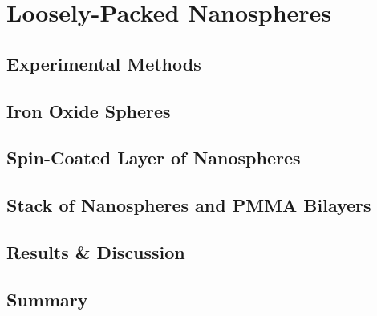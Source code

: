 \documentclass[\main/dresen_thesis.tex]{subfiles}
\renewcommand{\thisPath}{\main/chapters/looselyPackedNS}
\begin{document}
  \chapter{Loosely-Packed Nanospheres}\label{ch:looselyPackedNS}
    
      \FloatBarrier
      \clearpage

    \section{Experimental Methods}
      
        \FloatBarrier
        \clearpage

    \section{Iron Oxide Spheres}\label{sec:looselyPackedNP:sphericalIronOxideNP}
      
        \FloatBarrier
        \clearpage

    \section{Spin-Coated Layer of Nanospheres}
      
      \FloatBarrier
        \clearpage

    \section{Stack of Nanospheres and PMMA Bilayers}
      
      \FloatBarrier
        \clearpage

    \section{Results \& Discussion}
      \FloatBarrier
        \clearpage

    \section{Summary}
      
      \FloatBarrier
\end{document}
